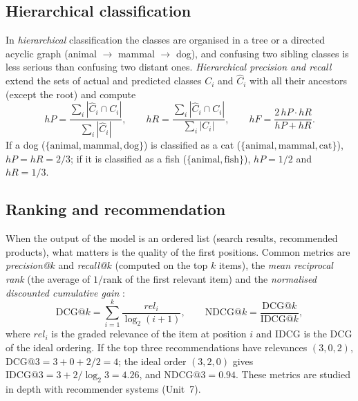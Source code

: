 \subsection{Hierarchical classification}

In \emph{hierarchical} classification the classes are organised in a tree or a directed acyclic
graph (animal $\to$ mammal $\to$ dog), and confusing two sibling classes is less serious than
confusing two distant ones. \emph{Hierarchical precision and recall} \citep{silla2011survey}
extend the sets of actual and predicted classes $C_i$ and $\hat C_i$ with all their ancestors
(except the root) and compute
\begin{equation}
  hP=\frac{\sum_i|\hat C_i\cap C_i|}{\sum_i|\hat C_i|},\qquad
  hR=\frac{\sum_i|\hat C_i\cap C_i|}{\sum_i|C_i|},\qquad
  hF=\frac{2\,hP\cdot hR}{hP+hR}.
\end{equation}
If a dog ($\{\text{animal},\text{mammal},\text{dog}\}$) is classified as a cat
($\{\text{animal},\text{mammal},\text{cat}\}$), $hP=hR=2/3$; if it is classified as a fish
($\{\text{animal},\text{fish}\}$), $hP=1/2$ and $hR=1/3$.

\subsection{Ranking and recommendation}

When the output of the model is an ordered list (search results, recommended products), what
matters is the quality of the first positions. Common metrics are \emph{precision@$k$} and
\emph{recall@$k$} (computed on the top $k$ items), the \emph{mean reciprocal rank} (the average
of $1/\text{rank}$ of the first relevant item) and the \emph{normalised discounted cumulative
gain} \citep{jarvelin2002cumulated}:
\begin{equation}
  \mathrm{DCG@}k=\sum_{i=1}^{k}\frac{\mathit{rel}_i}{\log_2(i+1)},
  \qquad
  \mathrm{NDCG@}k=\frac{\mathrm{DCG@}k}{\mathrm{IDCG@}k},
\end{equation}
where $\mathit{rel}_i$ is the graded relevance of the item at position $i$ and IDCG is the DCG
of the ideal ordering. If the top three recommendations have relevances $(3,0,2)$,
$\mathrm{DCG@3}=3+0+2/2=4$; the ideal order $(3,2,0)$ gives $\mathrm{IDCG@3}=3+2/\log_2 3=4.26$,
and $\mathrm{NDCG@3}=0.94$. These metrics are studied in depth with recommender systems
(Unit~7).

